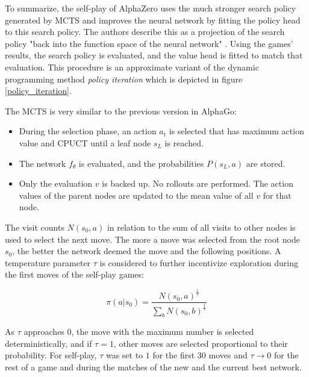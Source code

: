 To summarize, the self-play of AlphaZero uses the much stronger search policy generated by MCTS and improves the neural network by fitting the policy head to this search policy. The authors describe this as a projection of the search policy "back into the function space of the neural network" \cite[p. 19]{silver_mastering_2017}. Using the games' results, the search policy is evaluated, and the value head is fitted to match that evaluation. This procedure is an approximate variant of the dynamic programming method \textit{policy iteration} which is depicted in figure \ref{policy_iteration}.

The MCTS is very similar to the previous version in AlphaGo:
\begin{itemize}
    \item During the selection phase, an action $a_t$ is selected that has maximum action value and CPUCT until a leaf node $s_L$ is reached.
    \item The network $f_{\theta}$ is evaluated, and the probabilities $P(s_L, a)$ are stored.
    \item Only the evaluation $v$ is backed up. No rollouts are performed. The action values of the parent nodes are updated to the mean value of all $v$ for that node.
\end{itemize}

The visit counts $N(s_0, a)$ in relation to the sum of all visits to other nodes is used to select the next move. The more a move was selected from the root node $s_0$, the better the network deemed the move and the following positions. A temperature parameter $\tau$ is considered to further incentivize exploration during the first moves of the self-play games:

\begin{equation}
    \pi(a|s_0) = \frac{N(s_0, a)^{\frac{1}{\tau}}}{\sum_b N(s_0, b)^{\frac{1}{\tau}}}
    \label{eq:move_selection}
\end{equation}

As $\tau$ approaches $0$, the move with the maximum number is selected deterministically, and if $\tau = 1$, other moves are selected proportional to their probability. For self-play, $\tau$ was set to $1$ for the first 30 moves and $\tau \rightarrow 0$ for the rest of a game and during the matches of the new and the current best network.

